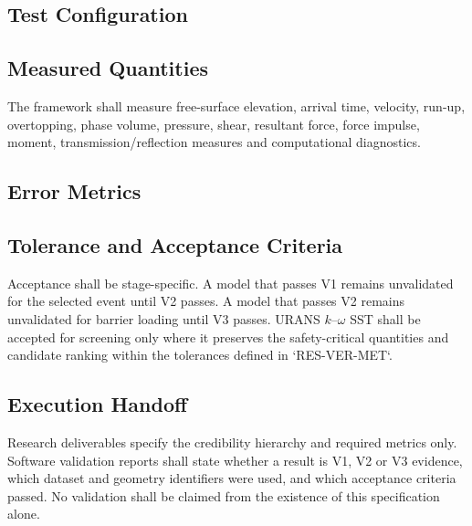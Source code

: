 
\subsection{Test Configuration}
\label{sec:res-ver-frm-test-configuration}


\subsection{Measured Quantities}
\label{sec:res-ver-frm-measured-quantities}


The framework shall measure free-surface elevation, arrival time,
velocity, run-up, overtopping, phase volume, pressure, shear, resultant
force, force impulse, moment, transmission/reflection measures and
computational diagnostics.

\subsection{Error Metrics}
\label{sec:res-ver-frm-error-metrics}


\subsection{Tolerance and Acceptance Criteria}
\label{sec:res-ver-frm-tolerance-acceptance-criteria}


Acceptance shall be stage-specific. A model that passes V1 remains
unvalidated for the selected event until V2 passes. A model that passes
V2 remains unvalidated for barrier loading until V3 passes. URANS
$k$--$\omega$ SST shall be accepted for screening only where it
preserves the safety-critical quantities and candidate ranking within
the tolerances defined in `RES-VER-MET`.

\subsection{Execution Handoff}
\label{sec:res-ver-frm-execution-handoff}

Research deliverables specify the credibility hierarchy and required
metrics only. Software validation reports shall state whether a result
is V1, V2 or V3 evidence, which dataset and geometry identifiers were
used, and which acceptance criteria passed. No validation shall be
claimed from the existence of this specification alone.

